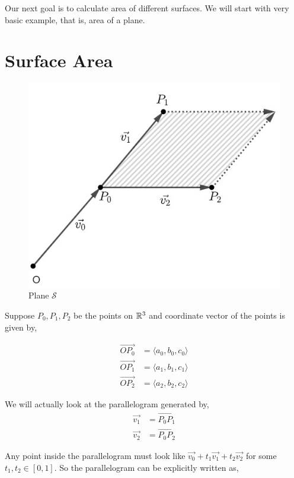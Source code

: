 \documentclass[../Analysis-3.tex]{subfiles}
\begin{document}
Our next goal is to calculate area of different surfaces. We will start with very basic example, that is, area of a plane.

\vfill

\pagebreak

\section{Surface Area} \label{marker}

\begin{figure}
  \centering
  \includegraphics[width=.78\linewidth]{../figures/lec-25.1.png}
  \caption{Plane $\mathcal{S}$}
\end{figure}

Suppose $P_0,P_1,P_2$ be the points on $\mathbb{R}^3$ and coordinate vector of the points is given by,

\begin{align*}
  \overrightarrow{OP_0} & = \langle a_0,b_0,c_0 \rangle \\
  \overrightarrow{OP_1} & = \langle a_1,b_1,c_1 \rangle \\
  \overrightarrow{OP_2} & = \langle a_2,b_2,c_2 \rangle
\end{align*}

We will actually look at the parallelogram generated by,
\begin{align*}
  \vec{v_1} & = \overrightarrow{P_0P_1} \\
  \vec{v_2} & = \overrightarrow{P_0P_2}
\end{align*}

Any point inside the parallelogram must look like $\vec{v_0} + t_1 \vec{v_1} +t_2 \vec{v_2}$ for some $t_1,t_2 \in [0,1]$. So the parallelogram can be explicitly written as,
\end{document}
